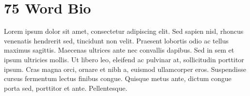 \section*{75 Word Bio}
Lorem ipsum dolor sit amet, consectetur adipiscing elit. Sed sapien nisl,
rhoncus venenatis hendrerit sed, tincidunt non velit. Praesent lobortis odio ac
tellus maximus sagittis. Maecenas ultrices ante nec convallis dapibus. Sed in
sem et ipsum ultricies mollis. Ut libero leo, eleifend ac pulvinar at,
sollicitudin porttitor ipsum. Cras magna orci, ornare et nibh a, euismod
ullamcorper eros. Suspendisse cursus fermentum lectus finibus congue. Quisque
metus ante, dictum congue porta sed, porttitor et ante. Pellentesque.
